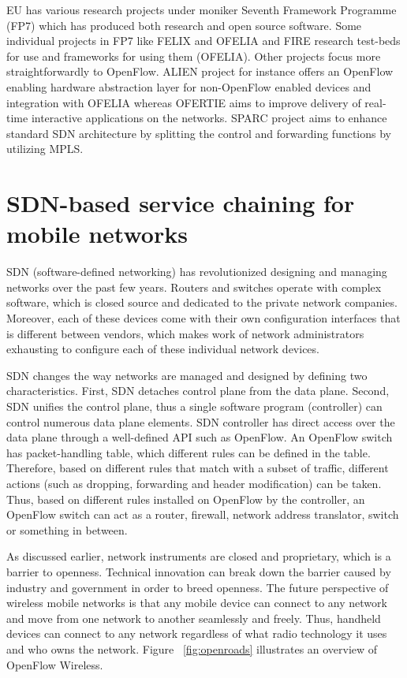 \documentclass[english]{tktltiki2}
\theoremstyle{definition}
\theoremstyle{remark}
\begin{document}
{EU has various research projects under moniker Seventh Framework Programme (FP7) which has produced both research and open source software. Some individual projects in FP7 like FELIX and OFELIA and FIRE research test-beds for use and frameworks for using them (OFELIA). Other projects focus more straightforwardly to OpenFlow. ALIEN project for instance offers an OpenFlow enabling hardware abstraction layer for non-OpenFlow enabled devices and integration with OFELIA whereas OFERTIE aims to improve delivery of real-time interactive applications on the networks. SPARC project aims to enhance standard SDN architecture by splitting the control and forwarding functions by utilizing MPLS.

\clearpage

\section{SDN-based service chaining for mobile networks}

SDN (software-defined networking) has revolutionized designing and managing networks over the past few years. Routers and switches operate with complex software, which is closed source and dedicated to the private network companies. Moreover, each of these devices come with their own configuration interfaces that is different between vendors, which makes work of network administrators exhausting to configure each of these individual network devices. \cite{FRZ13}

SDN changes the way networks are managed and designed by defining two characteristics. First, SDN detaches control plane from the data plane. Second, SDN unifies the control plane, thus a single software program (controller) can control numerous data plane elements. SDN controller has direct access over the data plane through a well-defined API such as OpenFlow. An OpenFlow switch has packet-handling table, which different rules can be defined in the table. Therefore, based on different rules that match with a subset of traffic, different actions (such as dropping, forwarding and header modification) can be taken. Thus, based on different rules installed on OpenFlow by the controller, an OpenFlow switch can act as a router, firewall, network address translator, switch or something in between. \cite{FRZ13}

As discussed earlier, network instruments are closed and proprietary, which is a barrier to openness. Technical innovation can break down the barrier caused by industry and government in order to breed openness. The future perspective of wireless mobile networks is that any mobile device can connect to any network and move from one network to another seamlessly and freely. Thus, handheld devices can connect to any network regardless of what radio technology it uses and who owns the network. Figure ~\ref{fig:openroads} illustrates an overview of OpenFlow Wireless. \cite{Yap10a}

}
\end{document}
